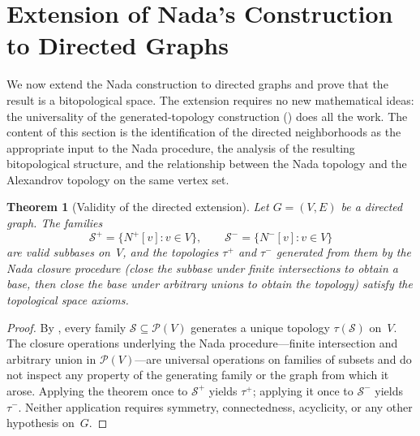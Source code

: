 \documentclass[11pt,a4paper]{article}
\theoremstyle{plain}
\newtheorem{theorem}{Theorem}[section]
\theoremstyle{definition}
\newcommand{\Nfwd}[1]{N^{+}[#1]}
\newcommand{\Nbwd}[1]{N^{-}[#1]}
\newcommand{\taufwd}{\tau^{+}}
\newcommand{\taubwd}{\tau^{-}}
\newcommand{\powerset}{\mathcal{P}}
\newcommand{\subbase}{\mathcal{S}}
\begin{document}
\section{Extension of Nada's Construction to Directed Graphs}%
\label{sec:extension}

We now extend the Nada construction to directed graphs and prove that the
result is a bitopological space.  The extension requires no new mathematical
ideas: the universality of the generated-topology construction
() does all the work.  The content of this section
is the identification of the directed neighborhoods as the appropriate input
to the Nada procedure, the analysis of the resulting bitopological structure,
and the relationship between the Nada topology and the Alexandrov topology on
the same vertex set.


\begin{theorem}[Validity of the directed extension]%
\label{thm:directed-validity}
Let $G = (V, E)$ be a directed graph.  The families
\[
  \subbase^{+} = \bigl\{\Nfwd{v} : v \in V\bigr\},
  \qquad
  \subbase^{-} = \bigl\{\Nbwd{v} : v \in V\bigr\}
\]
are valid subbases on~$V$, and the topologies $\taufwd$ and $\taubwd$ generated
from them by the Nada closure procedure (close the subbase under finite
intersections to obtain a base, then close the base under arbitrary unions to
obtain the topology) satisfy the topological space axioms.
\end{theorem}

\begin{proof}
By , every family $\subbase \subseteq \powerset(V)$
generates a unique topology $\tau(\subbase)$ on~$V$.  The closure operations
underlying the Nada procedure---finite intersection and arbitrary union in
$\powerset(V)$---are universal operations on families of subsets and do not
inspect any property of the generating family or the graph from which it arose.
Applying the theorem once to $\subbase^{+}$ yields $\taufwd$; applying it
once to $\subbase^{-}$ yields $\taubwd$.  Neither application requires
symmetry, connectedness, acyclicity, or any other hypothesis on~$G$.
\end{proof}

\end{document}

